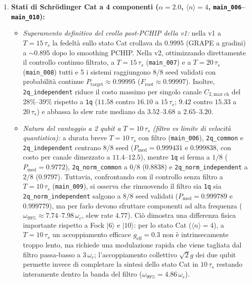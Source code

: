 \documentclass[11pt,a4paper]{article}
\begin{document}
\begin{enumerate}
    \item \textbf{Stati di Schrödinger Cat a 4 componenti ($\alpha = 2.0$, $\langle n \rangle = 4$, \texttt{main\_006}--\texttt{main\_010}):}
    \begin{itemize}
        \item \emph{Superamento definitivo del crollo post-PCHIP della v1:} nella v1 a $T = 15\,\tau_s$ la fedeltà sullo stato Cat crollava da $0.9995$ (GRAPE a gradini) a $\sim 0.895$ dopo lo smoothing PCHIP. Nella v2, ottimizzando direttamente il controllo continuo filtrato, a $T = 15\,\tau_s$ (\texttt{main\_007}) e a $T = 20\,\tau_s$ (\texttt{main\_008}) tutti e 5 i sistemi raggiungono $8/8$ seed validati con probabilità continue $P_{\text{target}} \approx 0.99995$ ($F_{\text{root}} \approx 0.99997$). Inoltre, \texttt{2q\_independent} riduce il costo massimo per singolo canale $C_{2,\text{max ch}}$ del $28\%\text{--}39\%$ rispetto a \texttt{1q} ($11.58$ contro $16.10$ a $15\,\tau_s$; $9.42$ contro $15.33$ a $20\,\tau_s$) e abbassa lo slew rate mediano da $3.52\text{--}3.68$ a $2.65\text{--}3.20$.
        \item \emph{Natura del vantaggio a 2 qubit a $T = 10\,\tau_s$ (filtro vs limite di velocità quantistica):} a durata breve $T = 10\,\tau_s$ con filtro (\texttt{main\_006}), \texttt{2q\_common} e \texttt{2q\_independent} centrano $8/8$ seed ($P_{\text{med}} = 0.999431$ e $0.999838$, con costo per canale dimezzato a $11.4\text{--}12.5$), mentre \texttt{1q} si ferma a $1/8$ ($P_{\text{med}} = 0.9772$), \texttt{2q\_norm\_common} a $0/8$ ($0.8838$) e \texttt{2q\_norm\_independent} a $2/8$ ($0.9797$). Tuttavia, confrontando con il controllo senza filtro a $T = 10\,\tau_s$ (\texttt{main\_009}), si osserva che rimuovendo il filtro sia \texttt{1q} sia \texttt{2q\_norm\_independent} salgono a $8/8$ seed validati ($P_{\text{med}} = 0.999789$ e $0.999779$), ma per farlo devono sfruttare componenti ad alta frequenza ($\omega_{99\%} \approx 7.74\text{--}7.98\,\omega_c$, slew rate $4.77$). Ciò dimostra una differenza fisica importante rispetto a Fock $|6\rangle$ e $|10\rangle$: per lo stato Cat ($\langle n \rangle = 4$), a $T = 10\,\tau_s$ un accoppiamento efficace $g_{\text{eff}} = 0.3$ non è intrinsecamente troppo lento, ma richiede una modulazione rapida che viene tagliata dal filtro passa-basso a $3\,\omega_c$; l'accoppiamento collettivo $\sqrt{2}g$ dei due qubit permette invece di completare la sintesi dello stato Cat in $10\,\tau_s$ restando interamente dentro la banda del filtro ($\omega_{99\%} = 4.86\,\omega_c$).
    \end{itemize}


\end{enumerate}
\end{document}
